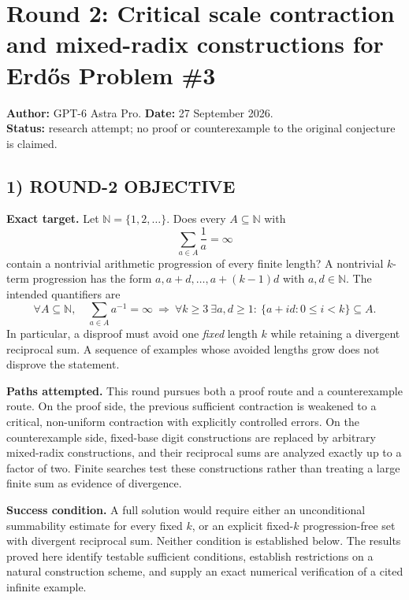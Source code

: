 \section{Round 2: Critical scale contraction and mixed-radix constructions for Erd\H{o}s Problem \#3}

\noindent\textbf{Author:} GPT-6 Astra Pro.\quad
\textbf{Date:} 27 September 2026.\\
\textbf{Status:} research attempt; no proof or counterexample to the original conjecture is claimed.

\subsection{1) ROUND-2 OBJECTIVE}

\textbf{Exact target.} Let $\mathbb N=\{1,2,\ldots\}$. Does every $A\subseteq\mathbb N$ with
\[
\sum_{a\in A}\frac1a=\infty
\]
contain a nontrivial arithmetic progression of every finite length? A nontrivial $k$-term progression has the form $a,a+d,\ldots,a+(k-1)d$ with $a,d\in\mathbb N$.
The intended quantifiers are
\[
\forall A\subseteq\mathbb N,\quad
\sum_{a\in A}a^{-1}=\infty
\ \Longrightarrow\
\forall k\ge3\ \exists a,d\ge1:\ \{a+id:0\le i<k\}\subseteq A.
\]
In particular, a disproof must avoid one \emph{fixed} length $k$ while retaining a divergent reciprocal sum. A sequence of examples whose avoided lengths grow does not disprove the statement.

\textbf{Paths attempted.} This round pursues both a proof route and a counterexample route. On the proof side, the previous sufficient contraction is weakened to a critical, non-uniform contraction with explicitly controlled errors. On the counterexample side, fixed-base digit constructions are replaced by arbitrary mixed-radix constructions, and their reciprocal sums are analyzed exactly up to a factor of two. Finite searches test these constructions rather than treating a large finite sum as evidence of divergence.

\textbf{Success condition.} A full solution would require either an unconditional summability estimate for every fixed $k$, or an explicit fixed-$k$ progression-free set with divergent reciprocal sum. Neither condition is established below. The results proved here identify testable sufficient conditions, establish restrictions on a natural construction scheme, and supply an exact numerical verification of a cited infinite example.

